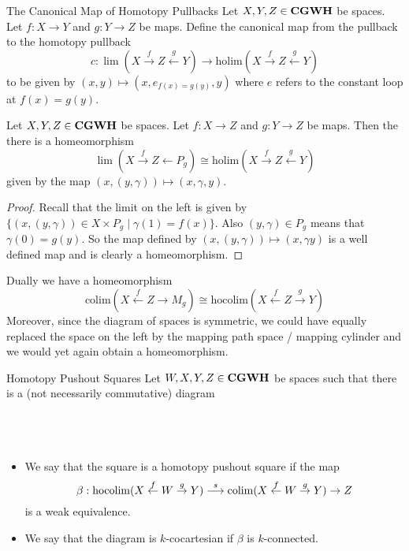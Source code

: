 \documentclass[a4paper]{article}
\begin{document}
\begin{defn}{The Canonical Map of Homotopy Pullbacks}{} Let $X,Y,Z\in\bold{CGWH}$ be spaces. Let $f:X\to Y$ and $g:Y\to Z$ be maps. Define the canonical map from the pullback to the homotopy pullback $$c:\lim(X\overset{f}{\rightarrow}Z\overset{g}{\leftarrow}Y)\to\text{holim}(X\overset{f}{\rightarrow}Z\overset{g}{\leftarrow}Y)$$ to be given by $(x,y)\mapsto(x,e_{f(x)=g(y)},y)$ where $e$ refers to the constant loop at $f(x)=g(y)$. 
\end{defn}

\begin{prp}{}{} Let $X,Y,Z\in\bold{CGWH}$ be spaces. Let $f:X\to Z$ and $g:Y\to Z$ be maps. Then the there is a homeomorphism $$\lim(X\overset{f}{\rightarrow}Z\leftarrow P_g)\cong\text{holim}(X\overset{f}{\rightarrow}Z\overset{g}{\leftarrow}Y)$$ given by the map $(x,(y,\gamma))\mapsto(x,\gamma,y)$. \tcbline
\begin{proof}
Recall that the limit on the left is given by $\{(x,(y,\gamma))\in X\times P_g\;|\;\gamma(1)=f(x)\}$. Also $(y,\gamma)\in P_g$ means that $\gamma(0)=g(y)$. So the map defined by $(x,(y,\gamma))\mapsto(x,\gamma y)$ is a well defined map and is clearly a homeomorphism. 
\end{proof}
\end{prp}

Dually we have a homeomorphism $$\text{colim}(X\overset{f}{\leftarrow}Z\rightarrow M_g)\cong\text{hocolim}(X\overset{f}{\leftarrow}Z\overset{g}{\rightarrow}Y)$$ Moreover, since the diagram of spaces is symmetric, we could have equally replaced the space on the left by the mapping path space / mapping cylinder and we would yet again obtain a homeomorphism. 

\begin{defn}{Homotopy Pushout Squares}{} Let $W,X,Y,Z\in\bold{CGWH}$ be spaces such that there is a (not necessarily commutative) diagram \\~\\
\\~\\
\begin{itemize}
\item We say that the square is a homotopy pushout square if the map $$\beta:\operatorname*{hocolim}(X\overset{f}{\leftarrow}W\overset{g}{\rightarrow}Y)\overset{s}{\longrightarrow}\operatorname*{colim}(X\overset{f}{\leftarrow}W\overset{g}{\rightarrow}Y)\to Z$$ is a weak equivalence. 
\item We say that the diagram is $k$-cocartesian if $\beta$ is $k$-connected. 
\end{itemize}
\end{defn}
\end{document}
